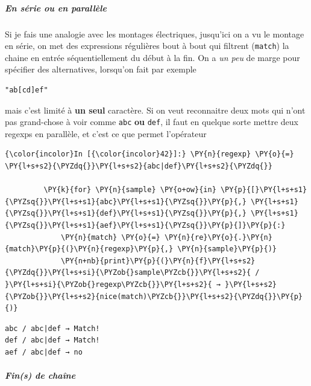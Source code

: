     \hypertarget{en-suxe9rie-ou-en-paralluxe8le}{%
\subparagraph{En série ou en
parallèle}\label{en-suxe9rie-ou-en-paralluxe8le}}

    Si je fais une analogie avec les montages électriques, jusqu'ici on a vu
le montage en série, on met des expressions régulières bout à bout qui
filtrent (\texttt{match}) la chaine en entrée séquentiellement du début
à la fin. On a \emph{un peu} de marge pour spécifier des alternatives,
lorsqu'on fait par exemple

\begin{verbatim}
"ab[cd]ef"
\end{verbatim}

mais c'est limité à \textbf{un seul} caractère. Si on veut reconnaitre
deux mots qui n'ont pas grand-chose à voir comme \texttt{abc}
\textbf{ou} \texttt{def}, il faut en quelque sorte mettre deux regexps
en parallèle, et c'est ce que permet l'opérateur \texttt{\textbar{}}

    \begin{Verbatim}[commandchars=\\\{\}]
{\color{incolor}In [{\color{incolor}42}]:} \PY{n}{regexp} \PY{o}{=} \PY{l+s+s2}{\PYZdq{}}\PY{l+s+s2}{abc|def}\PY{l+s+s2}{\PYZdq{}}
         
         \PY{k}{for} \PY{n}{sample} \PY{o+ow}{in} \PY{p}{[}\PY{l+s+s1}{\PYZsq{}}\PY{l+s+s1}{abc}\PY{l+s+s1}{\PYZsq{}}\PY{p}{,} \PY{l+s+s1}{\PYZsq{}}\PY{l+s+s1}{def}\PY{l+s+s1}{\PYZsq{}}\PY{p}{,} \PY{l+s+s1}{\PYZsq{}}\PY{l+s+s1}{aef}\PY{l+s+s1}{\PYZsq{}}\PY{p}{]}\PY{p}{:}
             \PY{n}{match} \PY{o}{=} \PY{n}{re}\PY{o}{.}\PY{n}{match}\PY{p}{(}\PY{n}{regexp}\PY{p}{,} \PY{n}{sample}\PY{p}{)}
             \PY{n+nb}{print}\PY{p}{(}\PY{n}{f}\PY{l+s+s2}{\PYZdq{}}\PY{l+s+si}{\PYZob{}sample\PYZcb{}}\PY{l+s+s2}{ / }\PY{l+s+si}{\PYZob{}regexp\PYZcb{}}\PY{l+s+s2}{ → }\PY{l+s+s2}{\PYZob{}}\PY{l+s+s2}{nice(match)\PYZcb{}}\PY{l+s+s2}{\PYZdq{}}\PY{p}{)}
\end{Verbatim}


    \begin{Verbatim}[commandchars=\\\{\}]
abc / abc|def → Match!
def / abc|def → Match!
aef / abc|def → no

    \end{Verbatim}

    \hypertarget{fins-de-chauxeene}{%
\subparagraph{Fin(s) de chaîne\\\\}\label{fins-de-chauxeene}}

